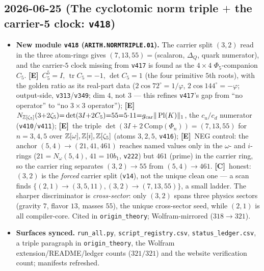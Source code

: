 \documentclass[11pt]{article}
\providecommand{\mE}{\textbf{[E]}}\providecommand{\mC}{\textbf{[C]}}
\providecommand{\vref}[1]{\texttt{#1}}
\providecommand{\gcar}{g_{\mathrm{car}}}\providecommand{\Nfam}{N_{\mathrm{fam}}}
\begin{document}
\subsection*{2026-06-25 (The cyclotomic norm triple $+$ the carrier-5 clock: \texttt{v418})}
\begin{itemize}
\item \textbf{New module \texttt{v418} (\texttt{ARITH.NORMTRIPLE.01}).} The carrier split $(3,2)$ read in
the three atom-rings gives $(7,13,55)=$(scalaron, $\Delta_Q$, quark numerator), and the carrier-$5$ clock
missing from \vref{v417} is found as the $4{\times}4$ $\Phi_5$-companion $C_5$. \mE\ $C_5^5{=}I$,
$\operatorname{tr}C_5{=}{-}1$, $\det C_5{=}1$ (the four primitive $5$th roots), with the golden ratio as its
real-part data ($2\cos72^\circ{=}1/\varphi$, $2\cos144^\circ{=}{-}\varphi$; output-side, \vref{v313}/\vref{v349};
dim $4$, not $3$ --- this refines \vref{v417}'s gap from ``no operator'' to ``no $3{\times}3$ operator''); \mE\
$N_{\Z[\zeta_5]}(3{+}2\zeta_5){=}\det(3I{+}2C_5){=}55{=}5{\cdot}11{=}\gcar\|\operatorname{Pl}(K)\|_1$, the
$c_u/c_d$ numerator (\vref{v410}/\vref{v411}); \mE\ the triple $\det(3I{+}2\,\mathrm{Comp}(\Phi_n))=(7,13,55)$
for $n{=}3,4,5$ over $\mathbb{Z}[\omega],\mathbb{Z}[i],\mathbb{Z}[\zeta_5]$ (atoms $3,2,5$, \vref{v416}); \mE\ NEG control: the anchor
$(5,4)\to(21,41,461)$ reaches named values only in the $\omega$- and $i$-rings ($21{=}N_\omega(5,4)$,
$41{=}10b_1$, \vref{v222}) but $461$ (prime) in the carrier ring, so the carrier ring separates
$(3,2)\to55$ from $(5,4)\to461$. \mC\ honest: $(3,2)$ is the \emph{forced} carrier split (\vref{v14}), not the
unique clean one --- a scan finds $\{(2,1)\to(3,5,11),(3,2)\to(7,13,55)\}$, a small ladder. The sharper discriminator is
\emph{cross-sector}: only $(3,2)$ spans three physics sectors (gravity $7$, flavor $13$, masses $55$),
the unique cross-sector seed, while $(2,1)$ is all compiler-core. Cited in
\texttt{origin\_theory}; Wolfram-mirrored ($318\to321$).
\item \textbf{Surfaces synced.} \texttt{run\_all.py}, \texttt{script\_registry.csv},
\texttt{status\_ledger.csv}, a triple paragraph in \texttt{origin\_theory}, the Wolfram
extension/README/ledger counts ($321/321$) and the website verification count; manifests refreshed.
\end{itemize}
\end{document}

